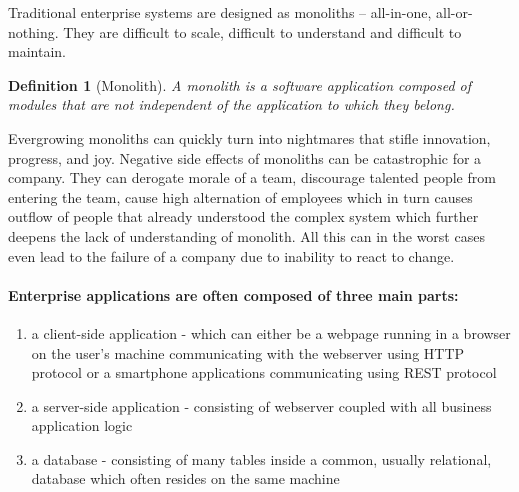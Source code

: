 \documentclass[12pt,oneside]{fithesis2}
\newtheorem{definition}{Definition}
\begin{document}
Traditional enterprise systems are designed as monoliths -- all-in-one, all-or-nothing. They are difficult to scale, difficult to understand and difficult to maintain.

\begin{definition}[Monolith]
A monolith is a software application composed of modules that are not independent of the application to which they belong. \cite{mytat} 
\end{definition}

Evergrowing monoliths can quickly turn into nightmares that stifle innovation, progress, and joy. Negative side effects of monoliths can be catastrophic for a company. They can derogate morale of a team, discourage talented people from entering the team, cause high alternation of employees which in turn causes outflow of people that already understood the complex system which further deepens the lack of understanding of monolith. All this can in the worst cases even lead to the failure of a company due to inability to react to change. \cite{rma}

\paragraph{Enterprise applications are often composed of three main parts:}

\begin{enumerate}
   \item a client-side application - which can either be a webpage running in a  browser on the user's machine communicating with the webserver using HTTP  protocol or a smartphone applications communicating using REST protocol
   \item a server-side application - consisting of webserver coupled with all business application logic
   \item a database - consisting of many tables inside a common, usually relational, database which often resides on the same machine
\end{enumerate}
\end{document}
